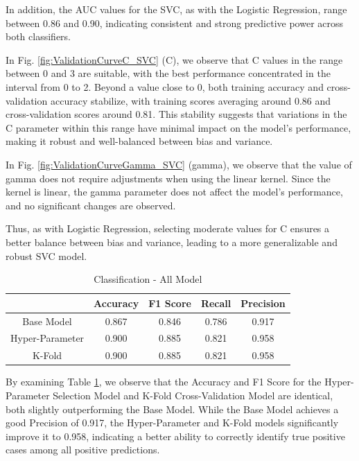 In addition, the AUC values for the SVC, as with the Logistic Regression, range between 0.86 and 0.90, indicating consistent and strong predictive power across both classifiers.

In Fig. \ref{fig:ValidationCurveC_SVC} (C), we observe that C values in the range between 0 and 3 are suitable, with the best performance concentrated in the interval from 0 to 2. Beyond a value close to 0, both training accuracy and cross-validation accuracy stabilize, with training scores averaging around 0.86 and cross-validation scores around 0.81. This stability suggests that variations in the C parameter within this range have minimal impact on the model's performance, making it robust and well-balanced between bias and variance.

In Fig. \ref{fig:ValidationCurveGamma_SVC} (gamma), we observe that the value of gamma does not require adjustments when using the linear kernel. Since the kernel is linear, the gamma parameter does not affect the model’s performance, and no significant changes are observed.

Thus, as with Logistic Regression, selecting moderate values for C ensures a better balance between bias and variance, leading to a more generalizable and robust SVC model.

\begin{table}[H]
    \centering
    \caption{Classification - All Model} 
    \begin{tabular}{||c| c c c c||} 
     \hline
     & Accuracy & F1 Score & Recall & Precision \\
     \hline\hline
     Base Model & 0.867 & 0.846 & 0.786 & 0.917 \\
     \hline
    Hyper-Parameter & 0.900 & 0.885 & 0.821 & 0.958 \\ 
    \hline
    K-Fold & 0.900 & 0.885 & 0.821 & 0.958 \\ 
    \hline
    \end{tabular}
    \label{tab:tab_SvcFinal}
\end{table}

By examining Table \ref{tab:tab_SvcFinal}, we observe that the Accuracy and F1 Score for the Hyper-Parameter Selection Model and K-Fold Cross-Validation Model are identical, both slightly outperforming the Base Model. While the Base Model achieves a good Precision of 0.917, the Hyper-Parameter and K-Fold models significantly improve it to 0.958, indicating a better ability to correctly identify true positive cases among all positive predictions.

